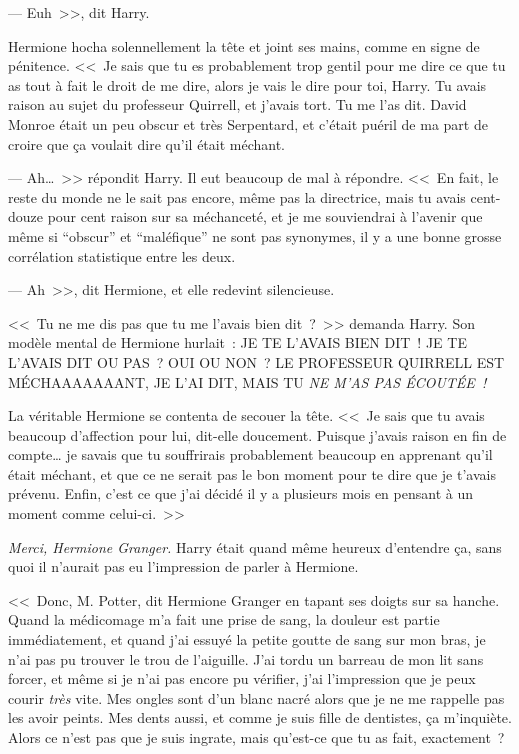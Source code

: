 --- Euh~>>, dit Harry.

Hermione hocha solennellement la tête et joint ses mains, comme en signe de pénitence. <<~Je sais que tu es probablement trop gentil pour me dire ce que tu as tout à fait le droit de me dire, alors je vais le dire pour toi, Harry. Tu avais raison au sujet du professeur Quirrell, et j'avais tort. Tu me l'as dit. David Monroe était un peu obscur et très Serpentard, et c'était puéril de ma part de croire que ça voulait dire qu'il était méchant.

--- Ah…~>> répondit Harry. Il eut beaucoup de mal à répondre. <<~En fait, le reste du monde ne le sait pas encore, même pas la directrice, mais tu avais cent-douze pour cent raison sur sa méchanceté, et je me souviendrai à l'avenir que même si “obscur” et “maléfique” ne sont pas synonymes, il y a une bonne grosse corrélation statistique entre les deux.

--- Ah~>>, dit Hermione, et elle redevint silencieuse.

<<~Tu ne me dis pas que tu me l'avais bien dit~?~>> demanda Harry. Son modèle mental de Hermione hurlait~: JE TE L'AVAIS BIEN DIT~! JE TE L'AVAIS DIT OU PAS~? OUI OU NON~? LE PROFESSEUR QUIRRELL EST MÉCHAAAAAAANT, JE L'AI DIT, MAIS TU \emph{NE M'AS PAS ÉCOUTÉE~!}

La véritable Hermione se contenta de secouer la tête. <<~Je sais que tu avais beaucoup d'affection pour lui, dit-elle doucement. Puisque j'avais raison en fin de compte… je savais que tu souffrirais probablement beaucoup en apprenant qu'il était méchant, et que ce ne serait pas le bon moment pour te dire que je t'avais prévenu. Enfin, c'est ce que j'ai décidé il y a plusieurs mois en pensant à un moment comme celui-ci.~>>

\emph{Merci, Hermione Granger.} Harry était quand même heureux d'entendre ça, sans quoi il n'aurait pas eu l'impression de parler à Hermione.

<<~Donc, M. Potter, dit Hermione Granger en tapant ses doigts sur sa hanche. Quand la médicomage m'a fait une prise de sang, la douleur est partie immédiatement, et quand j'ai essuyé la petite goutte de sang sur mon bras, je n'ai pas pu trouver le trou de l'aiguille. J'ai tordu un barreau de mon lit sans forcer, et même si je n'ai pas encore pu vérifier, j'ai l'impression que je peux courir \emph{très} vite. Mes ongles sont d'un blanc nacré alors que je ne me rappelle pas les avoir peints. Mes dents aussi, et comme je suis fille de dentistes, ça m'inquiète. Alors ce n'est pas que je suis ingrate, mais qu'est-ce que tu as fait, exactement~?

